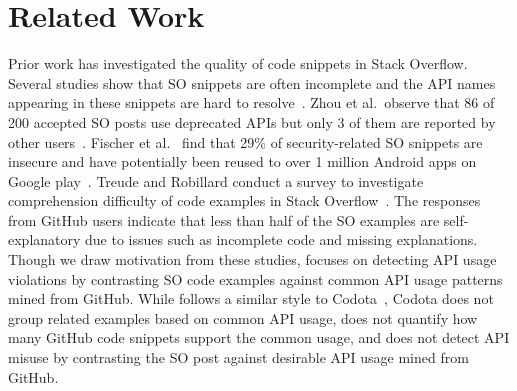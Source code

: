 \section{Related Work} 
Prior work has investigated the quality of code snippets in Stack Overflow. Several studies show that SO snippets are often incomplete and the API names appearing in these snippets are hard to resolve~\cite{dagenais2012recovering, subramanian2014live, yang2016query}. Zhou et al.~observe that 86 of 200 accepted SO posts use deprecated APIs but only 3 of them are reported by other users~\cite{zhou2016api}. Fischer et al.~ find that 29\% of security-related SO snippets are insecure and have potentially been reused to over 1 million Android apps on Google play~\cite{fischer2017stack}. Treude and Robillard conduct a survey to investigate comprehension difficulty of code examples in Stack Overflow~\cite{treude2017understanding}. The responses from GitHub users indicate that less than half of the SO examples are self-explanatory due to issues such as incomplete code and missing explanations. Though we draw motivation from these studies, {\tool} focuses on detecting API usage violations by contrasting SO code examples against common API usage patterns mined from GitHub. While {\tool} follows a similar style to Codota~\cite{codota}, Codota does not group related examples based on common API usage, does not quantify how many GitHub code snippets support the common usage, and does not detect API misuse by contrasting the SO post against desirable API usage mined from GitHub.


